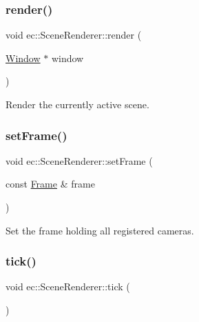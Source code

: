 \mbox{\label{classec_1_1_scene_renderer_aa8cdd59972fd7dc7ce7c65e69c4a358b}} 
\subsubsection{\texorpdfstring{render()}{render()}}
{\footnotesize\ttfamily void ec\+::\+Scene\+Renderer\+::render (\begin{DoxyParamCaption}\item[{\mbox{\hyperlink{classec_1_1_window}{Window}} $\ast$}]{window }\end{DoxyParamCaption})}



Render the currently active scene. 

\mbox{\label{classec_1_1_scene_renderer_a3981f0af87cf5b190b4dd5b0aa694472}} 
\subsubsection{\texorpdfstring{set\+Frame()}{setFrame()}}
{\footnotesize\ttfamily void ec\+::\+Scene\+Renderer\+::set\+Frame (\begin{DoxyParamCaption}\item[{const \mbox{\hyperlink{classec_1_1_frame}{Frame}} \&}]{frame }\end{DoxyParamCaption})}



Set the frame holding all registered cameras. 

\mbox{\label{classec_1_1_scene_renderer_a62a39c6b1097757c9757c17506a8b2b0}} 
\subsubsection{\texorpdfstring{tick()}{tick()}}
{\footnotesize\ttfamily void ec\+::\+Scene\+Renderer\+::tick (\begin{DoxyParamCaption}{ }\end{DoxyParamCaption})}



